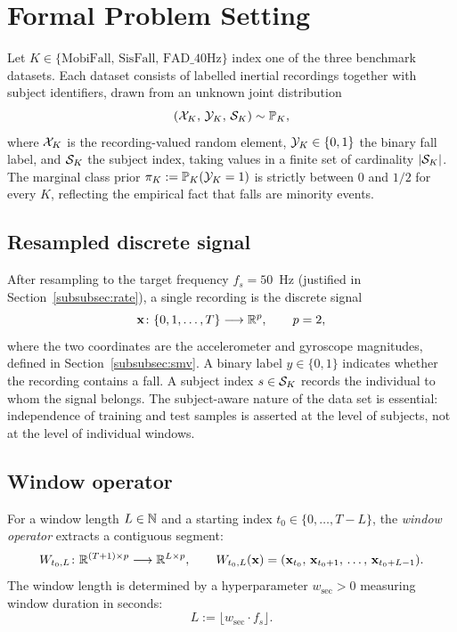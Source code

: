 \section{Formal Problem Setting}
\label{subsec:formal}

Let $K\in\{\mathrm{MobiFall},\,\mathrm{SisFall},\,\mathrm{FAD\_40Hz}\}$ index one of the three benchmark datasets. Each dataset consists of labelled inertial recordings together with subject identifiers, drawn from an unknown joint distribution
\[
  (\mathcal{X}_K,\,\mathcal{Y}_K,\,\mathcal{S}_K)\sim \mathbb{P}_K,
\]
where $\mathcal{X}_K$ is the recording-valued random element, $\mathcal{Y}_K\in\{0,1\}$ the binary fall label, and $\mathcal{S}_K$ the subject index, taking values in a finite set of cardinality $|\mathcal{S}_K|$. The marginal class prior $\pi_K:=\mathbb{P}_K(\mathcal{Y}_K=1)$ is strictly between $0$ and $1/2$ for every $K$, reflecting the empirical fact that falls are minority events.

\subsection{Resampled discrete signal}

After resampling to the target frequency $f_s=50$~Hz (justified in Section~\ref{subsubsec:rate}), a single recording is the discrete signal
\[
  \mathbf{x}\colon \{0,1,\ldots,T\}\longrightarrow\mathbb{R}^p,\qquad p=2,
\]
where the two coordinates are the accelerometer and gyroscope magnitudes, defined in Section~\ref{subsubsec:smv}. A binary label $y\in\{0,1\}$ indicates whether the recording contains a fall. A subject index $s\in\mathcal{S}_K$ records the individual to whom the signal belongs. The subject-aware nature of the data set is essential: independence of training and test samples is asserted at the level of subjects, not at the level of individual windows.

\subsection{Window operator}

For a window length $L\in\mathbb{N}$ and a starting index $t_0\in\{0,\ldots,T-L\}$, the \emph{window operator} extracts a contiguous segment:
\begin{equation}
  W_{t_0,L}\colon\mathbb{R}^{(T+1)\times p}\longrightarrow\mathbb{R}^{L\times p},
  \qquad
  W_{t_0,L}(\mathbf{x})=(\mathbf{x}_{t_0},\,\mathbf{x}_{t_0+1},\,\ldots,\,\mathbf{x}_{t_0+L-1}).
  \label{eq:window-op}
\end{equation}
The window length is determined by a hyperparameter $w_{\mathrm{sec}}>0$ measuring window duration in seconds:
\[
  L:=\lfloor w_{\mathrm{sec}}\cdot f_s\rfloor.
\]


